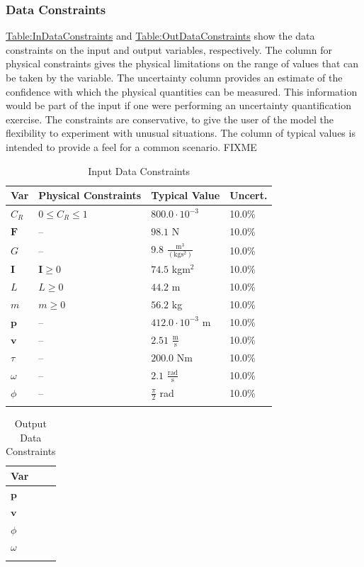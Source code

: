 \documentclass[12pt]{article}
\begin{document}
\subsubsection{Data Constraints}
\label{Sec:DataConstraints}
\hyperref[Table:InDataConstraints]{Table:InDataConstraints} and \hyperref[Table:OutDataConstraints]{Table:OutDataConstraints} show the data constraints on the input and output variables, respectively. The column for physical constraints gives the physical limitations on the range of values that can be taken by the variable. The uncertainty column provides an estimate of the confidence with which the physical quantities can be measured. This information would be part of the input if one were performing an uncertainty quantification exercise. The constraints are conservative, to give the user of the model the flexibility to experiment with unusual situations. The column of typical values is intended to provide a feel for a common scenario. FIXME
\begin{longtable}{l l l l}
\toprule
Var & Physical Constraints & Typical Value & Uncert.
\\
\midrule
${C_{R}}$ & $0\leq{}{C_{R}}\leq{}1$ & $800.0\cdot{}10^{-3}$ & 10.0\%
\\
$\mathbf{F}$ & -- & $98.1$ N & 10.0\%
\\
$G$ & -- & $9.8$ $\frac{\text{m}^{3}}{(\text{kg}\text{s}^{2})}$ & 10.0\%
\\
$\mathbf{I}$ & $\mathbf{I}\geq{}0$ & $74.5$ kg$\text{m}^{2}$ & 10.0\%
\\
$L$ & $L\geq{}0$ & $44.2$ m & 10.0\%
\\
$m$ & $m\geq{}0$ & $56.2$ kg & 10.0\%
\\
$\mathbf{p}$ & -- & $412.0\cdot{}10^{-3}$ m & 10.0\%
\\
$\mathbf{v}$ & -- & $2.51$ $\frac{\text{m}}{\text{s}}$ & 10.0\%
\\
$τ$ & -- & $200.0$ Nm & 10.0\%
\\
$ω$ & -- & $2.1$ $\frac{\text{rad}}{\text{s}}$ & 10.0\%
\\
$ϕ$ & -- & $\frac{π}{2}$ rad & 10.0\%
\\
\bottomrule
\caption{Input Data Constraints}
\label{Table:InDataConstraints}
\end{longtable}
\begin{longtable}{l}
\toprule
Var
\\
\midrule
$\mathbf{p}$
\\
$\mathbf{v}$
\\
$ϕ$
\\
$ω$
\\
\bottomrule
\caption{Output Data Constraints}
\label{Table:OutDataConstraints}
\end{longtable}
\end{document}
